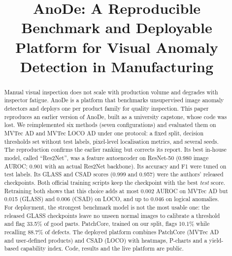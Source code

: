 \documentclass[conference]{IEEEtran}
\begin{document}
\title{AnoDe: A Reproducible Benchmark and Deployable\\Platform for Visual Anomaly Detection in Manufacturing}

\author{
}

\maketitle

\begin{abstract}
Manual visual inspection does not scale with production volume and degrades with inspector fatigue. AnoDe is a
platform that benchmarks unsupervised image anomaly detectors and deploys one per product family for quality
inspection. This paper reproduces an earlier version of AnoDe, built as a university capstone, whose code was lost.
We reimplemented six methods (seven configurations) and evaluated them on MVTec AD and MVTec LOCO AD under one
protocol: a fixed split, decision thresholds set without test labels, pixel-level localisation metrics, and
several seeds. The reproduction confirms the earlier ranking but corrects its report. Its best in-house model,
called ``Res2Net'', was a feature autoencoder on ResNet-50 (0.980 image AUROC; 0.901 with an actual Res2Net
backbone). Its accuracy and F1 were tuned on test labels. Its GLASS and CSAD scores (0.999 and 0.957) were the
authors' released checkpoints. Both official training scripts keep the checkpoint with the best \emph{test}
score. Retraining both shows that this choice adds at most 0.002 AUROC on MVTec AD but 0.015 (GLASS) and 0.006
(CSAD) on LOCO, and up to 0.046 on logical anomalies. For deployment, the strongest benchmark model is not the most usable one: the released GLASS
checkpoints leave no unseen normal images to calibrate a threshold and flag 33.5\% of good parts. PatchCore,
trained on our split, flags 10.1\% while recalling 88.7\% of defects. The deployed platform combines PatchCore
(MVTec AD and user-defined products) and CSAD (LOCO) with heatmaps, P-charts and a yield-based capability index.
Code, results and the live platform are public.
\end{abstract}
\end{document}
